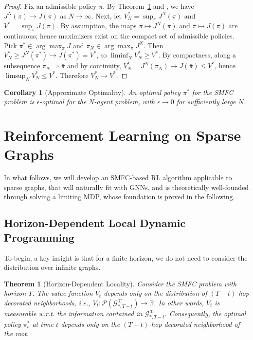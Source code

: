 \documentclass{article}
\newtheorem{corollary}{Corollary}
\newtheorem{theorem}{Theorem}
\begin{document}
\begin{proof}
Fix an admissible policy $\pi$. By Theorem~\ref{thm:locality} and \citet[Theorem~3.2]{lacker2023local},
we have $J^N(\pi)\to J(\pi)$ as $N\to\infty$.
Next, let $V_N^*=\sup_{\pi}J^N(\pi)$ and $V^*=\sup_{\pi}J(\pi)$.
By assumption, the maps $\pi\mapsto J^N(\pi)$ and $\pi\mapsto J(\pi)$
are continuous; hence maximizers exist on the compact set of admissible policies.
Pick $\pi^*\in\arg\max_\pi J$ and $\pi_N\in\arg\max_\pi J^N$.
Then $V_N^*\ge J^N(\pi^*)\to J(\pi^*)=V^*$, so $\liminf_N V_N^*\ge V^*$.
By compactness, along a subsequence $\pi_N\Rightarrow\bar\pi$ and by continuity,
$V_N^*=J^N(\pi_N)\to J(\bar\pi)\le V^*$, hence $\limsup_N V_N^*\le V^*$.
Therefore $V_N^*\to V^*$.
\end{proof}

\begin{corollary}[Approximate Optimality]
An optimal policy $\pi^*$ for the SMFC problem is $\epsilon$-optimal for the $N$-agent problem, with $\epsilon \to 0$ for sufficiently large $N$.
\end{corollary}

\section{Reinforcement Learning on Sparse Graphs}
\label{sec:rl}
In what follows, we will develop an SMFC-based RL algorithm applicable to sparse graphs, that will naturally fit with GNNs, and is theoretically well-founded through solving a limiting MDP, whose foundation is proved in the following.

\subsection{Horizon-Dependent Local Dynamic Programming}
To begin, a key insight is that for a finite horizon, we do not need to consider the distribution over infinite graphs.

\begin{theorem}[Horizon-Dependent Locality] \label{thm:locality}
Consider the SMFC problem with horizon $T$. The value function $V_t$ depends only on the distribution of $(T-t)$-hop decorated neighborhoods, i.e., $V_t: \mathcal{P}(\mathcal{G}_{*, T-t}^{\mathcal{X}}) \to \mathbb{R}$. In other words, $V_t$ is measurable w.r.t. the information contained in $\mathcal{G}_{*, T-t}^{\mathcal{X}}$. Consequently,
the optimal policy $\pi_t^*$ at time $t$ depends only on the $(T-t)$-hop decorated neighborhood of the root.
\end{theorem}
\end{document}
